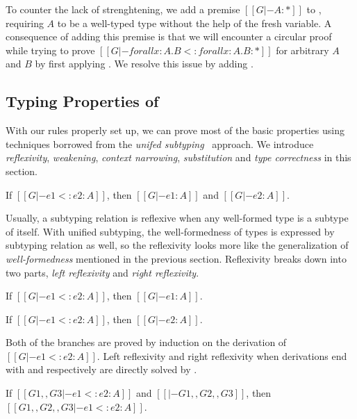 To counter the lack of strenghtening, we add a premise $[[G |- A : *]]$ to ,
requiring $A$ to be a well-typed type without the help of the fresh variable.
A consequence of adding this premise is that we will encounter a circular proof
while trying to prove $[[G |- forall x : A. B <: forall x : A . B : *]]$ for
arbitrary $A$ and $B$ by first applying . We resolve this issue by
adding .

\subsection{Typing Properties of \name}

With our rules properly set up, we can prove most of the basic properties
using techniques borrowed from the \emph{unifed subtyping}~\cite{full} approach.
We introduce \emph{reflexivity}, \emph{weakening},
\emph{context narrowing}, \emph{substitution} and \emph{type correctness}
in this section.

\begin{theorem}[Reflexivity]
   If $[[G |- e1 <: e2 : A]]$,
   then $[[G |- e1 : A]]$ and $[[G |- e2 : A]]$.
\end{theorem}

Usually, a subtyping relation is reflexive when any well-formed type is a subtype
of itself. With unified subtyping, the well-formedness of types is expressed by
subtyping relation as well, so the reflexivity looks more like the generalization
of \emph{well-formedness} mentioned in the previous section. Reflexivity
breaks down into two parts, \emph{left reflexivity} and \emph{right reflexivity}.

\begin{lemma}
   If $[[G |- e1 <: e2 : A]]$,
   then $[[G |- e1 : A]]$.
\end{lemma}

\begin{lemma}
   If $[[G |- e1 <: e2 : A]]$,
   then $[[G |- e2 : A]]$.
\end{lemma}

\noindent Both of the branches are proved by induction on the derivation of
$[[G |- e1 <: e2 : A]]$.
Left reflexivity and right reflexivity when derivations end with 
and  respectively are directly solved by .

\begin{theorem}[Weakening]
    If $[[G1 ,, G3 |- e1 <: e2 : A]]$ and $[[|- G1 ,, G2 ,, G3]]$,
    then $[[G1 ,, G2 ,, G3 |- e1 <: e2 : A]]$.
\end{theorem}

